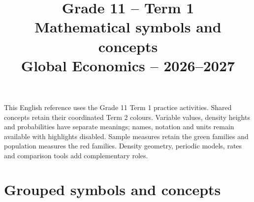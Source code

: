 


\usepackage{needspace}
\HighlightViewerLongtableFix
\geometry{a3paper,margin=20mm}
\raggedbottom
\COneTonePracticePalette
\setcounter{tocdepth}{2}
\title{Grade 11 -- Term 1\\Mathematical symbols and concepts\\[.5em]\large Global Economics -- 2026--2027}
\author{}\date{}
\newcommand{\COneToneViewerEntry}[2]{%
  \Needspace{12\baselineskip}%
  \subsection{#2}\par\nobreak
  \PracticeHighlightLegend{#1}%
}
\newcommand{\COneToneViewerReference}[1]{%
  \Needspace{10\baselineskip}%
  \subsubsection*{Definitions and introductory meanings}\par\nobreak
  \COneToneDetailedReference{#1}%
  \hyperref[tone:contents]{Back to contents}\par
}

\maketitle
This English reference uses the Grade 11 Term 1 practice activities. Shared
concepts retain their coordinated Term 2 colours. Variable values, density
heights and probabilities have separate meanings; names, notation and units
remain available with highlights disabled. Sample measures retain the green
families and population measures the red families. Density geometry, periodic
models, rates and comparison tools add complementary roles.
\tableofcontents\label{tone:contents}
\clearpage
\section{Grouped symbols and concepts}
\COneToneCatalog
\clearpage
{}
